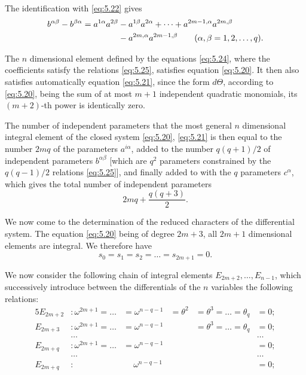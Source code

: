 The identification with \eqref{eq:5.22} gives
\begin{align}
  \label{eq:5.25}
  b^{\alpha\beta}-b^{\beta\alpha}=a^{1\alpha}a^{2\beta}&-a^{1\beta}a^{2\alpha}+\dots+a^{2m-1,\alpha}a^{2m,\beta}\\
  &-a^{2m,\alpha}a^{2m-1,\beta}\qquad(\alpha,\beta=1,2,\dots,q).
  \notag
\end{align}

The $n$ dimensional element defined by the equations \eqref{eq:5.24}, where the coefficients satisfy the relations \eqref{eq:5.25}, satisfies equation \eqref{eq:5.20}. It then also satisfies automatically equation \eqref{eq:5.21}, since the form $d\Theta$, according to \eqref{eq:5.20}, being the sum of at most $m+1$ independent quadratic monomials, its $(m+2)$-th power is identically zero.

The number of independent parameters that the most general $n$ dimensional integral element of the closed system \eqref{eq:5.20}, \eqref{eq:5.21} is then equal to the number $2mq$ of the parameters $a^{i\alpha}$, added to the number $q(q+1)/2$ of independent parameters $b^{\alpha\beta}$ [which are $q^{2}$ parameters constrained by the $q(q-1)/2$ relations \eqref{eq:5.25}], and finally added to with the $q$ parameters $c^{\alpha}$, which gives the total number of independent parameters
\begin{equation}
  \label{eq:5.26}
  2mq+\frac{q(q+3)}{2}.
\end{equation}



\vspace{12pt}\fsec We now come to the determination of the reduced characters of the differential system. The equation \eqref{eq:5.20} being of degree $2m+3$, all $2m+1$ dimensional elements are integral. We therefore have
\[
s_{0}=s_{1}=s_{2}=\dots=s_{2m+1}=0.
\]

We now consider the following chain of integral elements $E_{2m+2},\dots,E_{n-1}$, which successively introduce between the differentials of the $n$ variables the following relations:
\begin{alignat*}{5}
  E_{2m+2}&:\omega^{2m+1}=\dots&=\omega^{n-q-1}&=\theta^{2}&=\theta^{3}=\dots=\theta_{q}&=0;\\
  E_{2m+3}&:\omega^{2m+1}=\dots&=\omega^{n-q-1}&&=\theta^{3}=\dots=\theta_{q}&=0;\\
  &\dots&&&&\dots\\
  E_{2m+q}&:\omega^{2m+1}=\dots&=\omega^{n-q-1}&&&=0;\\
  &\dots&&&&\dots\\
  E_{2m+q}&:&\quad\ \omega^{n-q-1}&&&=0;\\
\end{alignat*}

